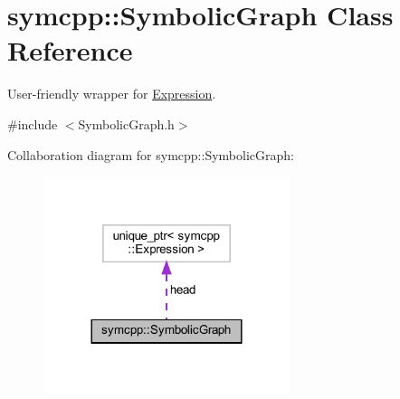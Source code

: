 \hypertarget{classsymcpp_1_1SymbolicGraph}{}\section{symcpp\+::Symbolic\+Graph Class Reference}
\label{classsymcpp_1_1SymbolicGraph}


User-\/friendly wrapper for \mbox{\hyperlink{classsymcpp_1_1Expression}{Expression}}.  




{\ttfamily \#include $<$Symbolic\+Graph.\+h$>$}



Collaboration diagram for symcpp\+::Symbolic\+Graph\+:
\nopagebreak
\begin{figure}[H]
\begin{center}
\leavevmode
\includegraphics[width=204pt]{classsymcpp_1_1SymbolicGraph__coll__graph}
\end{center}
\end{figure}
